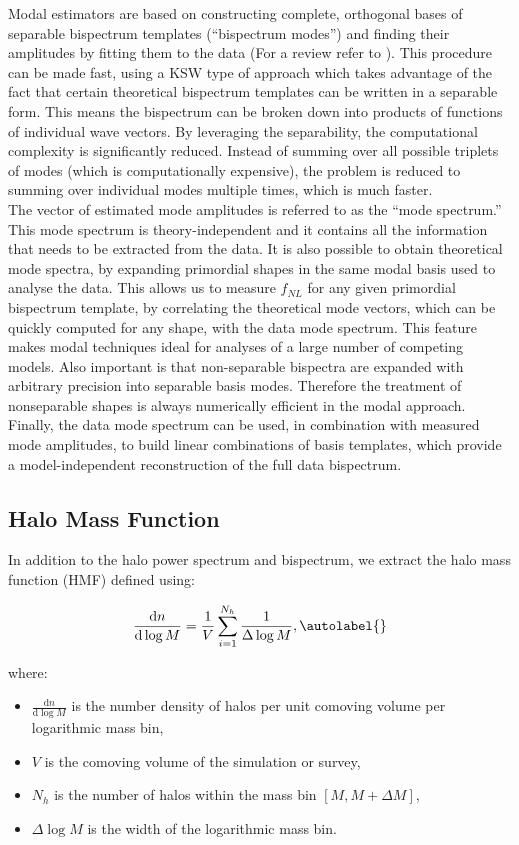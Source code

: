 Modal estimators \cite{Fergusson_2012} are based on
constructing complete, orthogonal bases of separable bispectrum
templates (“bispectrum modes”) and finding their amplitudes by
fitting them to the data (For a review refer to \cite{Liguori:2010hx} \cite{Jung_2022}). This procedure can be made fast, using a KSW type of approach \cite{Komatsu_2005} which takes advantage of the fact that certain theoretical bispectrum templates can be written in a separable form. This means the bispectrum can be broken down into products of functions of individual wave vectors. By leveraging the separability, the computational complexity is significantly reduced. Instead of summing over all possible triplets of modes (which is computationally expensive), the problem is reduced to summing over individual modes multiple times, which is much faster.\\
The vector of estimated mode amplitudes is referred to as the “mode spectrum.” This mode spectrum is theory-independent and it contains all the information that needs to be extracted from the data.
It is also possible to obtain theoretical mode spectra, by expanding primordial shapes in the same modal basis used to analyse
the data. This allows us to measure $f_{NL}$ for any given primordial
bispectrum template, by correlating the theoretical mode vectors, which can be quickly computed for any shape, with the data
mode spectrum. This feature makes modal techniques ideal for
analyses of a large number of competing models. Also important
is that non-separable bispectra are expanded with arbitrary precision into separable basis modes. Therefore the treatment of nonseparable shapes is always numerically efficient in the modal approach. Finally, the data mode spectrum can be used, in combination with measured mode amplitudes, to build linear combinations of basis templates, which provide a model-independent
reconstruction of the full data bispectrum.

\subsection{Halo Mass Function}
In addition to the halo power spectrum and bispectrum, we extract the halo mass function (HMF) defined using:

\begin{equation}
    \frac{\mathrm{d}n}{\mathrm{d}\log M} = \frac{1}{V} \sum_{i=1}^{N_h} \frac{1}{\Delta \log M}, \autolabel{}
\end{equation}

where:
\begin{itemize}
    \item \( \frac{\mathrm{d}n}{\mathrm{d}\log M} \) is the number density of halos per unit comoving volume per logarithmic mass bin,
    \item \( V \) is the comoving volume of the simulation or survey,
    \item \( N_h \) is the number of halos within the mass bin \([M, M + \Delta M]\),
    \item \( \Delta \log M \) is the width of the logarithmic mass bin.
\end{itemize}

